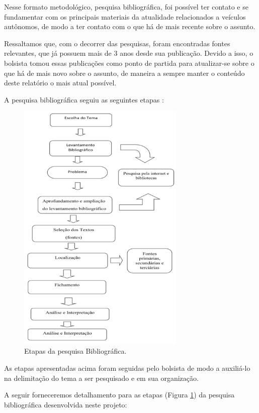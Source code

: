 Nesse formato metodológico, pesquisa bibliográfica, foi possível ter contato e se fundamentar com os principais materiais da atualidade relacionados a veículos autônomos, de modo a ter contato com o que há de mais recente sobre o assunto.

Ressaltamos que, com o decorrer das pesquisas, foram encontradas fontes relevantes, que já possuem mais de 3 anos desde sua publicação. Devido a isso, o bolsista tomou essas publicações como ponto de partida para atualizar-se sobre o que há de mais novo sobre o assunto, de maneira a sempre manter o conteúdo deste relatório o mais atual possível.

A pesquisa bibliográfica seguiu as seguintes etapas \cite{bibli}: 

\begin{figure}[H]
\centering
\includegraphics[width=8cm]{Figures/bibli.png}
\caption{Etapas da pesquisa Bibliográfica.}
\label{img_bibli}
\end{figure}

As etapas apresentadas acima foram seguidas pelo bolsista de modo a auxiliá-lo na
delimitação do tema a ser pesquisado e em sua organização.

\vspace {1cm}


A seguir forneceremos detalhamento para as etapas (Figura \ref{img_bibli}) da pesquisa bibliográfica desenvolvida neste projeto:

\vspace {1mm}


